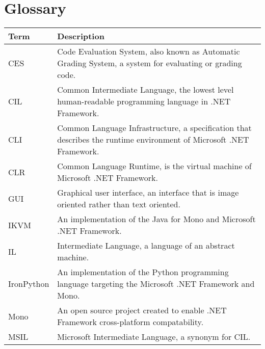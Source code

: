 \chapter*{Glossary}

\begin{center}
	\begin{tabular} { m{3cm} | m{11cm} }
		\hline
		\textbf{Term}	& \textbf{Description} \\ \hline
		CES				& Code Evaluation System, also known as Automatic Grading System, a system for evaluating or grading code. \\ \hline
		CIL				& Common Intermediate Language, the lowest level human-readable programming language in .NET Framework. \\ \hline
		CLI				& Common Language Infrastructure, a specification that describes the runtime environment of Microsoft .NET Framework. \\ \hline
		CLR				& Common Language Runtime, is the virtual machine of Microsoft .NET Framework. \\ \hline
		GUI				& Graphical user interface, an interface that is image oriented rather than text oriented. \\ \hline
		IKVM			& An implementation of the Java for Mono and Microsoft .NET Framework. \\ \hline
		IL				& Intermediate Language, a language of an abstract machine. \\ \hline
		IronPython		& An implementation of the Python programming language targeting the Microsoft .NET Framework and Mono. \\ \hline
		Mono			& An open source project created to enable .NET Framework cross-platform compatability. \\ \hline
		MSIL			& Microsoft Intermediate Language, a synonym for CIL. \\ \hline
	\end{tabular}
\end{center}

